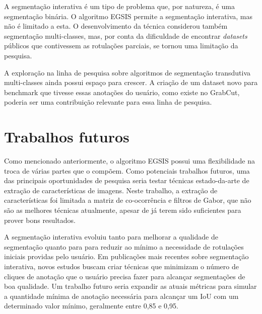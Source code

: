 A segmentação interativa é um tipo de problema que, por natureza, é
uma segmentação binária. O algoritmo \gls{EGSIS} permite a segmentação
interativa, mas não é limitado a esta. O desenvolvimento da técnica
considerou também segmentação multi-classes, mas, por conta da
dificuldade de encontrar \textit{datasets} públicos que contivessem as
rotulações parciais, se tornou uma limitação da pesquisa.

A exploração na linha de pesquisa sobre algoritmos de segmentação
transdutiva multi-classes ainda possui espaço para crescer. A criação
de um dataset novo para benchmark que tivesse essas anotações do
usuário, como existe no GrabCut, poderia ser uma contribuição
relevante para essa linha de pesquisa.


\section{Trabalhos futuros}\label{sec:trabalhos-futuros}

Como mencionado anteriormente, o algoritmo \gls{EGSIS} possui uma
flexibilidade na troca de várias partes que o compõem. Como potenciais
trabalhos futuros, uma das principais oportunidades de pesquisa seria
testar técnicas estado-da-arte de extração de características de
imagens. Neste trabalho, a extração de características foi limitada a
matriz de co-ocorrência e filtros de Gabor, que não são as melhores
técnicas atualmente, apesar de já terem sido suficientes para prover
bons resultados.

A segmentação interativa evoluiu tanto para melhorar a qualidade de
segmentação quanto para para reduzir ao mínimo a necessidade de
rotulações iniciais providas pelo usuário. Em publicações mais
recentes sobre segmentação interativa, novos estudos buscam criar
técnicas que minimizam o número de cliques de anotação que o usuário
precisa fazer para alcançar segmentações de boa qualidade. Um trabalho
futuro seria expandir as atuais métricas para simular a quantidade
mínima de anotação necessária para alcançar um IoU com um determinado
valor mínimo, geralmente entre 0,85 e 0,95.
